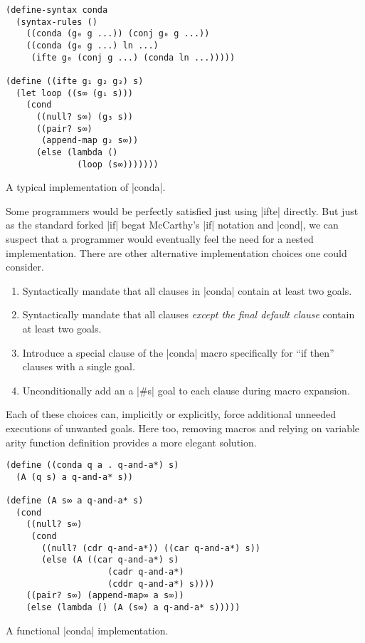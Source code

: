 \documentclass[sigplan,screen,draft,anonymous,review,natbib=false]{acmart}
\begin{document}
\begin{listing}
  \begin{verbatim}
(define-syntax conda
  (syntax-rules ()
    ((conda (g₀ g ...)) (conj g₀ g ...))
    ((conda (g₀ g ...) ln ...)
     (ifte g₀ (conj g ...) (conda ln ...)))))

(define ((ifte g₁ g₂ g₃) s)
  (let loop ((s∞ (g₁ s)))
    (cond
      ((null? s∞) (g₃ s))
      ((pair? s∞)
       (append-map g₂ s∞))
      (else (lambda ()
              (loop (s∞)))))))
  \end{verbatim}
  \caption{A typical implementation of \rackinline|conda|.}
  \label{mnt:conda-implementation}
\end{listing}

Some programmers would be perfectly satisfied just using
\rackinline|ifte| directly. But just as the standard forked
\rackinline|if| begat McCarthy's \rackinline|if| notation and
\rackinline|cond|, we can suspect that a programmer would eventually
feel the need for a nested implementation. There are other alternative
implementation choices one could consider.

\begin{enumerate}

\item Syntactically mandate that all clauses in \rackinline|conda|
  contain at least two goals.

\item Syntactically mandate that all clauses \emph{except the final
    default clause} contain at least two goals.

\item Introduce a special clause of the \rackinline|conda| macro
  specifically for \enquote{if then} clauses with a single goal.

\item Unconditionally add an a \rackinline|#s| goal to each clause
  during macro expansion.

\end{enumerate}

Each of these choices can, implicitly or explicitly, force additional
unneeded executions of unwanted goals. Here too, removing macros and
relying on variable arity function definition provides a more elegant
solution.

\begin{listing}
  \begin{verbatim}
(define ((conda q a . q-and-a*) s)
  (A (q s) a q-and-a* s))

(define (A s∞ a q-and-a* s)
  (cond
    ((null? s∞)
     (cond
       ((null? (cdr q-and-a*)) ((car q-and-a*) s))
       (else (A ((car q-and-a*) s)
                    (cadr q-and-a*)
                    (cddr q-and-a*) s))))
    ((pair? s∞) (append-map∞ a s∞))
    (else (lambda () (A (s∞) a q-and-a* s)))))
  \end{verbatim}
  \caption{A functional \rackinline|conda| implementation.}
  \label{mnt:conda-good-re-implementation}
\end{listing}
\end{document}
